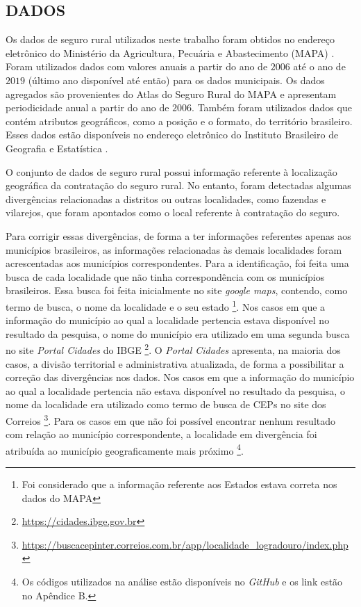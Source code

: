 
\subsection{DADOS}


Os dados de seguro rural utilizados neste trabalho foram obtidos no endereço eletrônico do Ministério da Agricultura, Pecuária e Abastecimento (MAPA) \cite{brasil21}. Foram utilizados dados com valores anuais a partir do ano de $2006$ até o ano de $2019$ (último ano disponível até então) para os dados municipais. Os dados agregados são provenientes do Atlas do Seguro Rural do MAPA e apresentam periodicidade anual a partir do ano de $2006$. Também foram utilizados dados que contém atributos geográficos, como a posição e o formato, do território brasileiro. Esses dados estão disponíveis no endereço eletrônico do Instituto Brasileiro de Geografia e Estatística \cite{ibge20}.

O conjunto de dados de seguro rural possui informação referente à localização geográfica da contratação do seguro rural. No entanto, foram detectadas algumas divergências relacionadas a distritos ou outras localidades, como fazendas e vilarejos, que foram apontados como o local referente à contratação do seguro. 

Para corrigir essas divergências, de forma a ter informações referentes apenas aos municípios brasileiros, as informações relacionadas às demais localidades foram acrescentadas aos municípios correspondentes. Para a identificação, foi feita uma busca de cada localidade que não tinha correspondência com os municípios brasileiros. Essa busca foi feita inicialmente no site \textit{google maps}, contendo, como termo de busca, o nome da localidade e o seu estado \footnote{Foi considerado que a informação referente aos Estados estava correta nos dados do MAPA}. Nos casos em que a informação do município ao qual a localidade pertencia estava disponível no resultado da pesquisa, o nome do município era utilizado em uma segunda busca no site \textit{Portal Cidades} do IBGE \footnote{\url{https://cidades.ibge.gov.br}}. O \textit{Portal Cidades} apresenta, na maioria dos casos, a divisão territorial e administrativa atualizada, de forma a possibilitar a correção das divergências nos dados. Nos casos em que a informação do município ao qual a localidade pertencia não estava disponível no resultado da pesquisa, o nome da localidade era utilizado como termo de busca de CEPs no site dos Correios \footnote{\url{https://buscacepinter.correios.com.br/app/localidade_logradouro/index.php}}. Para os casos em que não foi possível encontrar nenhum resultado com relação ao município correspondente, a localidade em divergência foi atribuída ao município geograficamente mais próximo \footnote{Os códigos utilizados na análise estão disponíveis no \textit{GitHub} e os link estão no Apêndice B.}.

